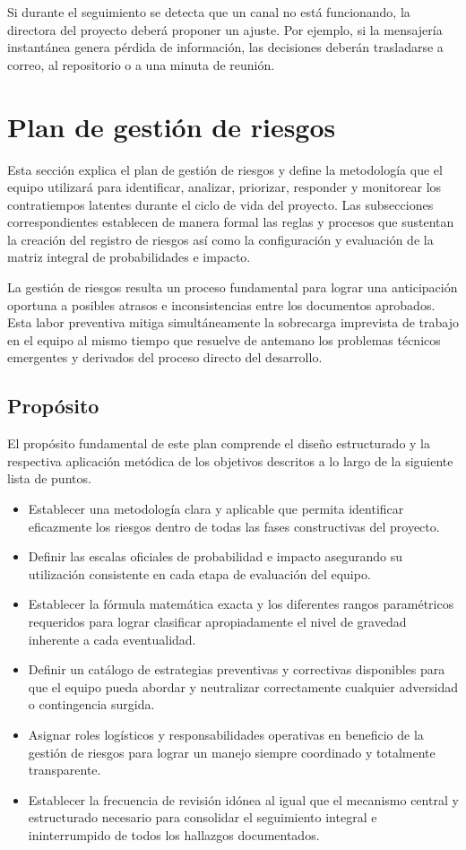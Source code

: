 \documentclass[11pt,spanish]{article}
\begin{document}
Si durante el seguimiento se detecta que un canal no está funcionando, la directora del proyecto deberá proponer un ajuste. Por ejemplo, si la mensajería instantánea genera pérdida de información, las decisiones deberán trasladarse a correo, al repositorio o a una minuta de reunión.

\newpage
\section{Plan de gestión de riesgos}

Esta sección explica el plan de gestión de riesgos y define la metodología que el equipo utilizará para identificar, analizar, priorizar, responder y monitorear los contratiempos latentes durante el ciclo de vida del proyecto. Las subsecciones correspondientes establecen de manera formal las reglas y procesos que sustentan la creación del registro de riesgos así como la configuración y evaluación de la matriz integral de probabilidades e impacto.

La gestión de riesgos resulta un proceso fundamental para lograr una anticipación oportuna a posibles atrasos e inconsistencias entre los documentos aprobados. Esta labor preventiva mitiga simultáneamente la sobrecarga imprevista de trabajo en el equipo al mismo tiempo que resuelve de antemano los problemas técnicos emergentes y derivados del proceso directo del desarrollo.

\subsection{Propósito}

El propósito fundamental de este plan comprende el diseño estructurado y la respectiva aplicación metódica de los objetivos descritos a lo largo de la siguiente lista de puntos.

\begin{itemize}
    \item Establecer una metodología clara y aplicable que permita identificar eficazmente los riesgos dentro de todas las fases constructivas del proyecto.
    \item Definir las escalas oficiales de probabilidad e impacto asegurando su utilización consistente en cada etapa de evaluación del equipo.
    \item Establecer la fórmula matemática exacta y los diferentes rangos paramétricos requeridos para lograr clasificar apropiadamente el nivel de gravedad inherente a cada eventualidad.
    \item Definir un catálogo de estrategias preventivas y correctivas disponibles para que el equipo pueda abordar y neutralizar correctamente cualquier adversidad o contingencia surgida.
    \item Asignar roles logísticos y responsabilidades operativas en beneficio de la gestión de riesgos para lograr un manejo siempre coordinado y totalmente transparente.
    \item Establecer la frecuencia de revisión idónea al igual que el mecanismo central y estructurado necesario para consolidar el seguimiento integral e ininterrumpido de todos los hallazgos documentados.
\end{itemize}
\end{document}

